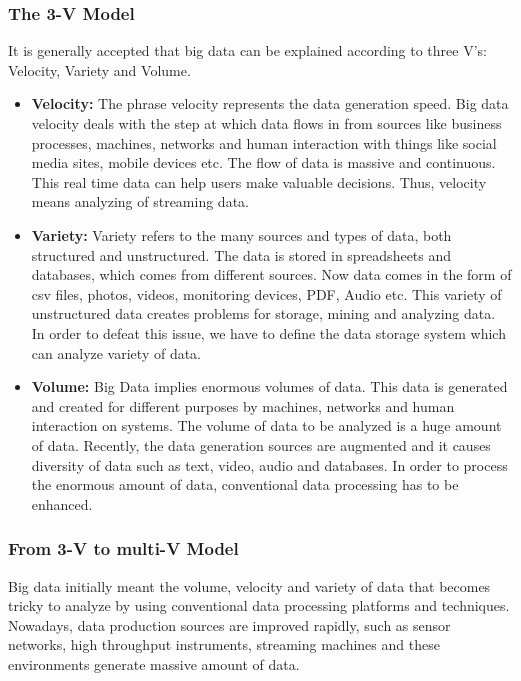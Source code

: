 \subsubsection{The 3-V Model}
\label{3vm}
It is generally accepted that big data can be explained according to three V's: Velocity, Variety and Volume.\\

\begin{itemize}
\item \textbf{Velocity:} The phrase velocity represents the data generation speed. Big data velocity deals with the step at which data flows in from sources like business processes, machines, networks and human interaction with things like social media sites, mobile devices etc. The flow of data is massive and continuous. This real time data can help users make valuable decisions. Thus, velocity means analyzing of streaming data.\\

\item \textbf{Variety:} Variety refers to the many sources and types of data, both structured and unstructured. The data is stored in spreadsheets and databases, which comes from different sources. Now data comes in the form of csv files, photos, videos, monitoring devices, PDF, Audio etc. This variety of unstructured data creates problems for storage, mining and analyzing data. In order to defeat this issue, we have to define the data storage system which can analyze variety of data.\\

\item \textbf{Volume:} Big Data implies enormous volumes of data. This data is generated and created for different purposes by machines, networks and human interaction on systems. The volume of data to be analyzed is a huge amount of data. Recently, the data generation sources are augmented and it causes diversity of data such as text, video, audio and databases. In order to process the enormous amount of data, conventional data processing has to be enhanced.\\
\end{itemize}


\subsubsection{From 3-V to multi-V Model}

Big data initially meant the volume, velocity and variety of data that becomes
tricky to analyze by using conventional data processing platforms and techniques. Nowadays, data production sources are improved rapidly, such as sensor networks, high throughput instruments, streaming machines and these environments generate massive amount of data.\\

